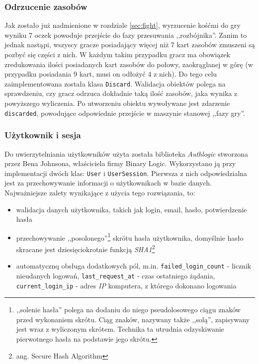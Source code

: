 \documentclass[a4paper,12pt]{article}
\begin{document}
\subsubsection{Odrzucenie zasobów}
Jak zostało już nadmienione w rozdziale \ref{sec:fight}, wyrzucenie
kośćmi do gry wyniku 7 oczek powoduje przejście do fazy przesuwania
,,rozbójnika''. Zanim to jednak nastąpi, wszyscy gracze posiadający
więcej niż 7 kart zasobów zmuszeni są pozbyć się części z nich. W
każdym takim przypadku gracz ma obowiązek zredukowania ilości
posiadanych kart zasobów do połowy, zaokrąglanej w górę (w przypadku
posiadania 9 kart, musi on odłożyć 4 z nich). Do tego celu
zaimplementowana została klasa \texttt{Discard}. Walidacja obiektów
polega na sprawdzeniu, czy gracz odrzuca dokładnie taką ilość zasobów,
jaka wynika z powyższego wyliczenia. Po utworzeniu obiektu wywoływane
jest zdarzenie \texttt{discarded}, powodujące odpowiednie przejście w
maszynie stanowej ,,fazy gry''.

\subsubsection{Użytkownik i sesja}
Do uwierzytelniania użytkowników użyta została biblioteka
\emph{Authlogic} stworzona przez Bena Johnsona, właściciela firmy
Binary Logic. Wykorzystano ją przy implementacji dwóch klas:
\texttt{User} i \texttt{UserSession}. Pierwsza z nich odpowiedzialna
jest za przechowywanie informacji o użytkownikach w bazie
danych. Najważniejsze zalety wynikające z użycia tego rozwiązania, to:

\begin{itemize}
\item walidacja danych użytkownika, takich jak login, email, hasło,
  potwierdzenie hasła
\item przechowywanie ,,posolonego''\footnote{,,solenie hasła'' polega
    na dodaniu do niego pseudolosowego ciągu znaków przed wykonaniem
    skrótu. Ciąg znaków, nazywany także ,,solą'', zapisywany jest wraz
    z wyliczonym skrótem. Technika ta utrudnia odzyskiwanie
    pierwotnego hasła na podstawie jego skrótu.} skrótu hasła użytkownika,
  domyślnie hasło skracane jest dziesięciokrotnie funkcją
  \emph{SHA1}\footnote{ang. Secure Hash Algorithm}
\item automatycznq obsługa dodatkowych pól,
  m.in. \texttt{failed\_login\_count} - licznik nieudanych logowań,
  \texttt{last\_request\_at} - czas ostatniego żądania,
  \texttt{current\_login\_ip} - adres \emph{IP} komputera, z którego
  dokonano logowania
\end{itemize}
\end{document}
